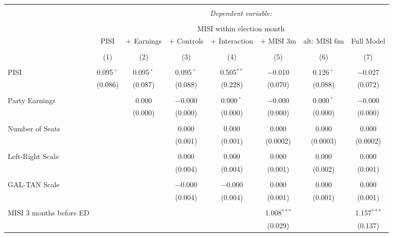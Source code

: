 
\begin{table}[!htbp] \centering
  \caption{}
  \label{}
\begin{tabular}{@{\extracolsep{10pt}}lccccccc}
\\[-1.8ex]\hline
\hline \\[-1.8ex]
 & \multicolumn{7}{c}{\textit{Dependent variable:}} \\
\cline{2-8}
\\[-1.8ex] & \multicolumn{7}{c}{MISI within election month} \\
 & PISI & + Earnings & + Controls & + Interaction & + MISI 3m & alt: MISI 6m & Full Model \\
\\[-1.8ex] & (1) & (2) & (3) & (4) & (5) & (6) & (7)\\
\hline \\[-1.8ex]
 PISI & 0.095$^{・}$ & 0.095$^{・}$ & 0.095$^{・}$ & 0.505$^{**}$ & $-$0.010 & 0.126$^{・}$ & $-$0.027 \\
  & (0.086) & (0.087) & (0.088) & (0.228) & (0.070) & (0.088) & (0.072) \\
  & & & & & & & \\
 Party Earnings &  & 0.000 & $-$0.000 & 0.000$^{・}$ & $-$0.000 & 0.000$^{・}$ & $-$0.000 \\
  &  & (0.000) & (0.000) & (0.000) & (0.000) & (0.000) & (0.000) \\
  & & & & & & & \\
 Number of Seats &  &  & 0.000 & 0.000 & 0.000 & 0.000 & 0.000 \\
  &  &  & (0.001) & (0.001) & (0.0002) & (0.0003) & (0.0002) \\
  & & & & & & & \\
 Left-Right Scale &  &  & 0.000 & 0.000 & 0.000 & 0.000 & 0.000 \\
  &  &  & (0.004) & (0.004) & (0.001) & (0.002) & (0.001) \\
  & & & & & & & \\
 GAL-TAN Scale &  &  & $-$0.000 & $-$0.000 & 0.000 & 0.000 & 0.000 \\
  &  &  & (0.004) & (0.004) & (0.001) & (0.001) & (0.001) \\
  & & & & & & & \\
 MISI 3 months before ED &  &  &  &  & 1.008$^{***}$ &  & 1.157$^{***}$ \\
  &  &  &  &  & (0.029) &  & (0.137) \\

\end{tabular}
\end{table}
